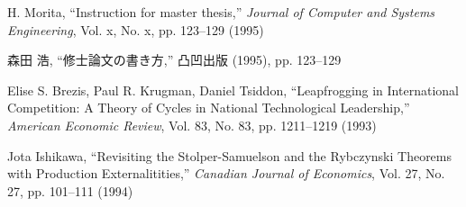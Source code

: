  H. Morita, ``Instruction for master thesis,'' \textit{Journal of Computer and Systems Engineering}, Vol. x, No. x, pp. 123--129 (1995)

 森田 浩, ``修士論文の書き方,'' 凸凹出版 (1995), pp. 123--129 

 Elise S. Brezis, Paul R. Krugman, Daniel Tsiddon, ``Leapfrogging in International Competition: A Theory of Cycles
                  in National Technological Leadership,'' \textit{American Economic Review}, Vol. 83, No. 83, pp. 1211--1219 (1993)

 Jota Ishikawa, ``Revisiting the {Stolper}-{Samuelson} and the {Rybczynski}
                  Theorems with Production Externalitities,'' \textit{Canadian Journal of Economics}, Vol. 27, No. 27, pp. 101--111 (1994)

